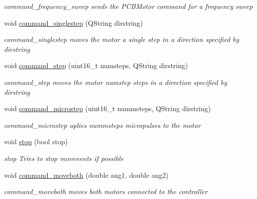 \begin{DoxyCompactItemize}
\begin{DoxyCompactList}\small\item\em command\+\_\+frequency\+\_\+sweep sends the P\+C\+B\+Motor command for a frequency sweep \end{DoxyCompactList}\item 
void \hyperlink{classMotor_ae052b079f5bd433c3561eb8b6d772b80}{command\+\_\+singlestep} (Q\+String dirstring)
\begin{DoxyCompactList}\small\item\em command\+\_\+singlestep moves the motor a single step in a direction specified by dirstring \end{DoxyCompactList}\item 
void \hyperlink{classMotor_aafbe8e02e29d2a81287747ae09b3d9fa}{command\+\_\+step} (uint16\+\_\+t numsteps, Q\+String dirstring)
\begin{DoxyCompactList}\small\item\em command\+\_\+step moves the motor numstep steps in a direction specified by dirstring \end{DoxyCompactList}\item 
void \hyperlink{classMotor_abfbe0b96cfb97107128084ec065e31c2}{command\+\_\+microstep} (uint16\+\_\+t nummsteps, Q\+String dirstring)
\begin{DoxyCompactList}\small\item\em command\+\_\+microstep aplies nummsteps micropulses to the motor \end{DoxyCompactList}\item 
void \hyperlink{classMotor_a9ca6508221ea2c42a5220848ab37df30}{stop} (bool stop)
\begin{DoxyCompactList}\small\item\em stop Tries to stop movenents if possible \end{DoxyCompactList}\item 
void \hyperlink{classMotor_a3d179f71c181cbeb3cdb44af166e532d}{command\+\_\+moveboth} (double ang1, double ang2)
\begin{DoxyCompactList}\small\item\em command\+\_\+moveboth moves both motors connected to the controller \end{DoxyCompactList}\end{DoxyCompactItemize}
